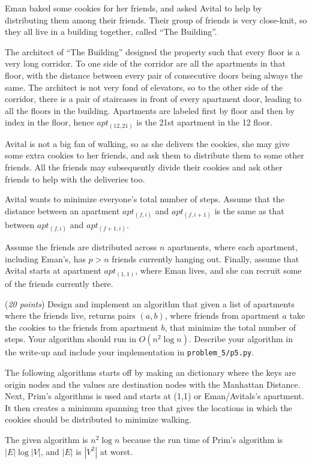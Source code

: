 \documentclass{hw}
\begin{document}
\newpage


\begin{problem}
    Eman baked some cookies for her friends, and asked Avital to help by distributing them among their friends. Their group of friends is very close-knit, so they all live in a building together, called ``The Building''.
  
    The architect of ``The Building'' designed the property such that every floor is a very long corridor. To one side of the corridor are all the apartments in that floor, with the distance between every pair of consecutive doors being always the same. The architect is not very fond of elevators, so to the other side of the corridor, there is a pair of staircases in front of every apartment door, leading to all the floors in the building. Apartments are labeled first by floor and then by index in the floor, hence $apt_{(12,21)}$ is the 21st apartment in the 12 floor.

    Avital is not a big fan of walking, so as she delivers the cookies, she may give some extra cookies to her friends, and ask them to distribute them to some other friends. All the friends may subsequently divide their cookies and ask other friends to help with the deliveries too. 
  
    Avital wants to minimize everyone's total number of steps. Assume that the distance between an apartment $apt_{(f,i)}$ and $apt_{(f,i+1)}$ is the same as that between $apt_{(f,i)}$ and $apt_{(f+1,i)}$. 
  
    Assume the friends are distributed across $n$ apartments, where each apartment, including Eman's, has $p > n$ friends currently hanging out. Finally, assume that Avital starts at apartment $apt_{(1,1)}$, where Eman lives, and she can recruit some of the friends currently there.

    (\textit{20 points}) Design and implement an algorithm that given a list of apartments where the friends live, returns pairs $(a, b)$, where friends from apartment $a$ take the cookies to the friends from apartment $b$, that minimize the total number of steps. Your algorithm should run in $O(n^2 \log n)$. Describe your algorithm in the write-up and include your implementation in \texttt{problem\_5/p5.py}.

    \begin{solution}
        The following algorithms starts off by making an dictionary where the keys are origin nodes and the values are destination nodes with the Manhattan Distance. Next, Prim's algorithms is used and starts at (1,1) or Eman/Avitals's apartment. It then creates a minimum spanning tree that gives the locations in which the cookies should be distributed to minimize walking.

        The given algorithm is $n^2 \log n$ because the run time of Prim's algorithm is $|E| \log |V|$, and $|E|$ is $|V^2|$ at worst.
    \end{solution}
\end{problem}
\end{document}
